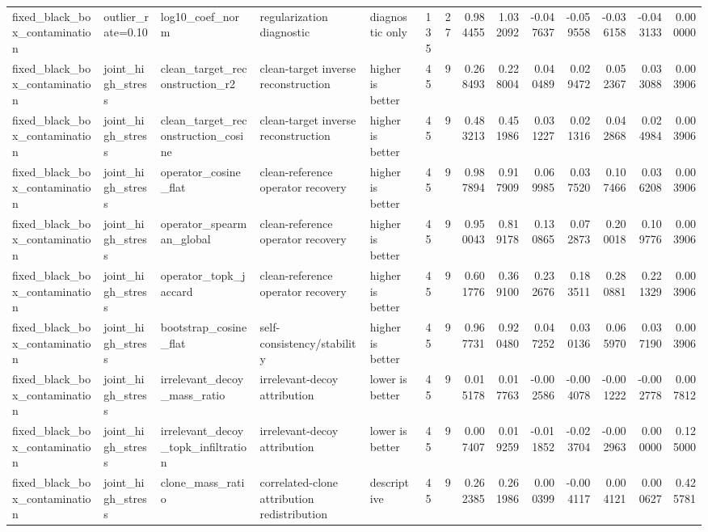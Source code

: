 \begin{table}[t]
\begin{tabular}{lllllrrrrrrrrr}
fixed_black_box_contamination & outlier_rate=0.10 & log10_coef_norm & regularization diagnostic & diagnostic only & 135 & 27 & 0.984455 & 1.032092 & -0.047637 & -0.059558 & -0.036158 & -0.043133 & 0.000000 \\
fixed_black_box_contamination & joint_high_stress & clean_target_reconstruction_r2 & clean-target inverse reconstruction & higher is better & 45 & 9 & 0.268493 & 0.228004 & 0.040489 & 0.029472 & 0.052367 & 0.033088 & 0.003906 \\
fixed_black_box_contamination & joint_high_stress & clean_target_reconstruction_cosine & clean-target inverse reconstruction & higher is better & 45 & 9 & 0.483213 & 0.451986 & 0.031227 & 0.021316 & 0.042868 & 0.024984 & 0.003906 \\
fixed_black_box_contamination & joint_high_stress & operator_cosine_flat & clean-reference operator recovery & higher is better & 45 & 9 & 0.987894 & 0.917909 & 0.069985 & 0.037520 & 0.107466 & 0.036208 & 0.003906 \\
fixed_black_box_contamination & joint_high_stress & operator_spearman_global & clean-reference operator recovery & higher is better & 45 & 9 & 0.950043 & 0.819178 & 0.130865 & 0.072873 & 0.200018 & 0.109776 & 0.003906 \\
fixed_black_box_contamination & joint_high_stress & operator_topk_jaccard & clean-reference operator recovery & higher is better & 45 & 9 & 0.601776 & 0.369100 & 0.232676 & 0.183511 & 0.280881 & 0.221329 & 0.003906 \\
fixed_black_box_contamination & joint_high_stress & bootstrap_cosine_flat & self-consistency/stability & higher is better & 45 & 9 & 0.967731 & 0.920480 & 0.047252 & 0.030136 & 0.065970 & 0.037190 & 0.003906 \\
fixed_black_box_contamination & joint_high_stress & irrelevant_decoy_mass_ratio & irrelevant-decoy attribution & lower is better & 45 & 9 & 0.015178 & 0.017763 & -0.002586 & -0.004078 & -0.001222 & -0.002778 & 0.007812 \\
fixed_black_box_contamination & joint_high_stress & irrelevant_decoy_topk_infiltration & irrelevant-decoy attribution & lower is better & 45 & 9 & 0.007407 & 0.019259 & -0.011852 & -0.023704 & -0.002963 & 0.000000 & 0.125000 \\
fixed_black_box_contamination & joint_high_stress & clone_mass_ratio & correlated-clone attribution redistribution & descriptive & 45 & 9 & 0.262385 & 0.261986 & 0.000399 & -0.004117 & 0.004121 & 0.000627 & 0.425781 \\

\end{tabular}
\end{table}
